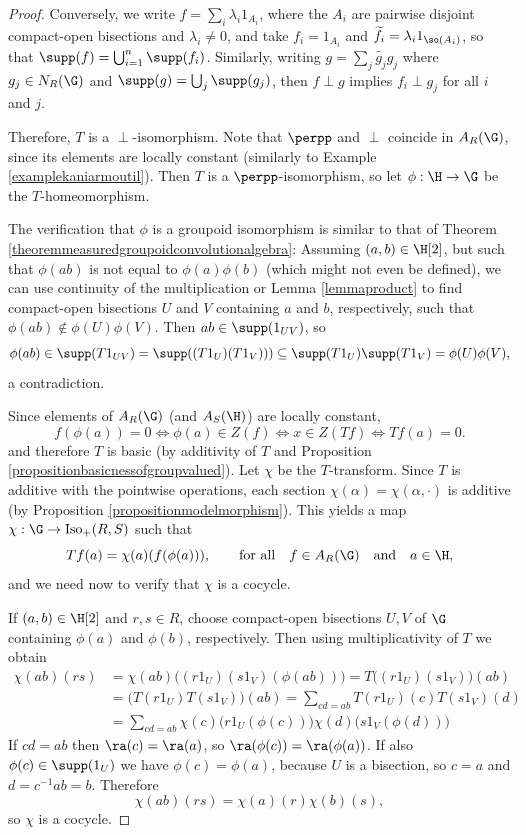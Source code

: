 \begin{proof}
Conversely, we write $f=\sum_i\lambda_i1_{A_i}$, where the $A_i$ are pairwise disjoint compact-open bisections and $\lambda_i\neq 0$, and take $f_i=1_{A_i}$ and $\widetilde{f_i}=\lambda_i1_{\so(A_i)}$, so that $\supp(f)=\bigcup_{i=1}^n\supp(f_i)$. Similarly, writing $g=\sum_j\widetilde{g_j}g_j$ where $g_j\in N_R(\G)$ and $\supp(g)=\bigcup_j\supp(g_j)$, then $f\perp g$ implies $f_i\perp g_j$ for all $i$ and $j$.

Therefore, $T$ is a $\perp$-isomorphism. Note that $\perpp$ and $\perp$ coincide in $A_R(\G)$, since its elements are locally constant (similarly to Example \ref{examplekaniarmoutil}). Then $T$ is a $\perpp$-isomorphism, so let $\phi:\H\to\G$ be the $T$-homeomorphism.

The verification that $\phi$ is a groupoid isomorphism is similar to that of Theorem \ref{theoremmeasuredgroupoidconvolutionalgebra}: Assuming $(a,b)\in\H[2]$, but such that $\phi(ab)$ is not equal to $\phi(a)\phi(b)$ (which might not even be defined), we can use continuity of the multiplication or Lemma \ref{lemmaproduct} to find compact-open bisections $U$ and $V$ containing $a$ and $b$, respectively, such that $\phi(ab)\not\in\phi(U)\phi(V)$. Then $ab\in\supp(1_{UV})$, so
\[\phi(ab)\in\supp(T1_{UV})=\supp((T1_U)(T1_V)))\subseteq\supp(T1_U)\supp(T1_V)=\phi(U)\phi(V),\]
a contradiction.

Since elements of $A_R(\G)$ (and $A_S(\H)$) are locally constant,
\[f(\phi(a))=0\iff \phi(a)\in Z(f)\iff x\in Z(Tf)\iff Tf(a)=0.\]
and therefore $T$ is basic (by additivity of $T$ and Proposition \ref{propositionbasicnessofgroupvalued}). Let $\chi$ be the $T$-transform. Since $T$ is additive with the pointwise operations, each section $\chi(\alpha)=\chi(\alpha,\cdot)$ is additive (by Proposition \ref{propositionmodelmorphism}). This yields a map $\chi:\G\to\operatorname{Iso}_+(R,S)$ such that
\[Tf(a)=\chi(a)(f(\phi(a))),\qquad\text{for all}\quad f\in A_R(\G)\quad\text{and}\quad a\in\H,\]
and we need now to verify that $\chi$ is a cocycle.

If $(a,b)\in\H[2]$ and $r,s\in R$, choose compact-open bisections $U,V$ of $\G$ containing $\phi(a)$ and $\phi(b)$, respectively. Then using multiplicativity of $T$ we obtain
\begin{align*}
\chi(ab)(rs)&=\chi(ab)\big((r1_U)(s1_V)(\phi(ab))\big)=T\big((r1_U)(s1_V)\big)(ab)\\
&=\big(T(r1_U)T(s1_V)\big)(ab)=\sum_{cd=ab}T(r1_U)(c)T(s1_V)(d)\\
&=\sum_{cd=ab}\chi(c)\big(r1_U(\phi(c))\big)\chi(d)\big(s1_V(\phi(d))\big)
\end{align*}
If $cd=ab$ then $\ra(c)=\ra(a)$, so $\ra(\phi(c))=\ra(\phi(a))$. If also $\phi(c)\in\supp(1_U)$ we have $\phi(c)=\phi(a)$, because $U$ is a bisection, so $c=a$ and $d=c^{-1}ab=b$. Therefore
\[\chi(ab)(rs)=\chi(a)(r)\chi(b)(s),\]
so $\chi$ is a cocycle.


\end{proof}
